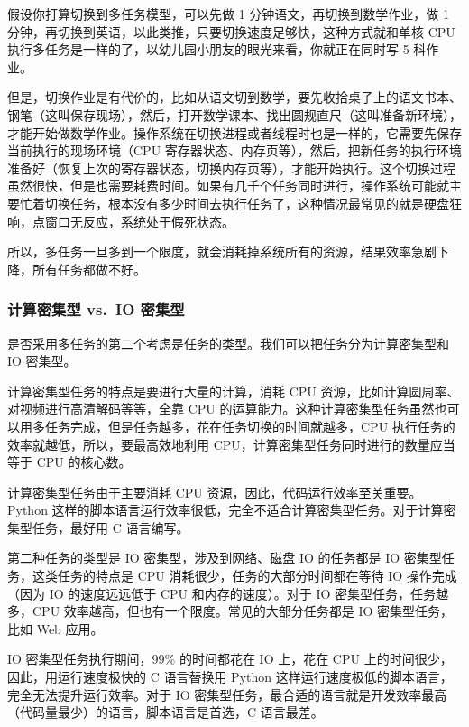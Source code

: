 假设你打算切换到多任务模型，可以先做 1 分钟语文，再切换到数学作业，做 1
分钟，再切换到英语，以此类推，只要切换速度足够快，这种方式就和单核 CPU
执行多任务是一样的了，以幼儿园小朋友的眼光来看，你就正在同时写 5
科作业。

但是，切换作业是有代价的，比如从语文切到数学，要先收拾桌子上的语文书本、钢笔（这叫保存现场），然后，打开数学课本、找出圆规直尺（这叫准备新环境），才能开始做数学作业。操作系统在切换进程或者线程时也是一样的，它需要先保存当前执行的现场环境（CPU
寄存器状态、内存页等），然后，把新任务的执行环境准备好（恢复上次的寄存器状态，切换内存页等），才能开始执行。这个切换过程虽然很快，但是也需要耗费时间。如果有几千个任务同时进行，操作系统可能就主要忙着切换任务，根本没有多少时间去执行任务了，这种情况最常见的就是硬盘狂响，点窗口无反应，系统处于假死状态。

所以，多任务一旦多到一个限度，就会消耗掉系统所有的资源，结果效率急剧下降，所有任务都做不好。

\hypertarget{ux8ba1ux7b97ux5bc6ux96c6ux578b-vs.-io-ux5bc6ux96c6ux578b}{%
\subsubsection{计算密集型 vs.~IO
密集型}\label{ux8ba1ux7b97ux5bc6ux96c6ux578b-vs.-io-ux5bc6ux96c6ux578b}}

是否采用多任务的第二个考虑是任务的类型。我们可以把任务分为计算密集型和
IO 密集型。

计算密集型任务的特点是要进行大量的计算，消耗 CPU
资源，比如计算圆周率、对视频进行高清解码等等，全靠 CPU
的运算能力。这种计算密集型任务虽然也可以用多任务完成，但是任务越多，花在任务切换的时间就越多，CPU
执行任务的效率就越低，所以，要最高效地利用
CPU，计算密集型任务同时进行的数量应当等于 CPU 的核心数。

计算密集型任务由于主要消耗 CPU 资源，因此，代码运行效率至关重要。Python
这样的脚本语言运行效率很低，完全不适合计算密集型任务。对于计算密集型任务，最好用
C 语言编写。

第二种任务的类型是 IO 密集型，涉及到网络、磁盘 IO 的任务都是 IO
密集型任务，这类任务的特点是 CPU 消耗很少，任务的大部分时间都在等待 IO
操作完成（因为 IO 的速度远远低于 CPU 和内存的速度）。对于 IO
密集型任务，任务越多，CPU 效率越高，但也有一个限度。常见的大部分任务都是
IO 密集型任务，比如 Web 应用。

IO 密集型任务执行期间，99\% 的时间都花在 IO 上，花在 CPU
上的时间很少，因此，用运行速度极快的 C 语言替换用 Python
这样运行速度极低的脚本语言，完全无法提升运行效率。对于 IO
密集型任务，最合适的语言就是开发效率最高（代码量最少）的语言，脚本语言是首选，C
语言最差。


